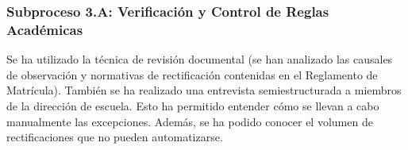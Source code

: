 \subsubsection{Subproceso 3.A: Verificación y Control de Reglas Académicas}

Se ha utilizado la t\'ecnica de revisi\'on documental (se han analizado las causales de observaci\'on y normativas de rectificaci\'on contenidas en el Reglamento de Matr\'icula). Tambi\'en se ha realizado una entrevista semiestructurada a miembros de la direcci\'on de escuela. Esto ha permitido entender c\'omo se llevan a cabo manualmente las excepciones. Adem\'as, se ha podido conocer el volumen de rectificaciones que no pueden automatizarse.